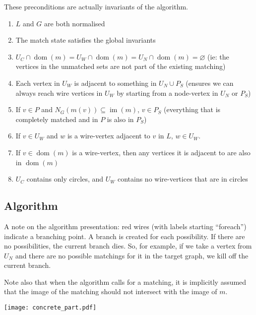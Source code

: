 \documentclass{article}
\DeclareMathOperator{\dom}{dom}
\DeclareMathOperator{\im}{im}
\begin{document}
These preconditions are actually invariants of the algorithm.

\begin{enumerate}
  \renewcommand{\theenumi}{(\roman{enumi})}
  \renewcommand{\labelenumi}{\theenumi}
  \item \label{enum:il-inv-norm} $L$ and $G$ are both normalised
  \item \label{enum:il-inv-inv} The match state satisfies the global invariants
  \item \label{enum:il-inv-unmatched} $U_C\cap\dom(m) = U_W\cap\dom(m) = U_N\cap\dom(m) = \varnothing$ (ie: the vertices in the unmatched sets are not part of the existing matching)
  \item \label{enum:il-inv-reachable} Each vertex in $U_W$ is adjacent to something in $U_N\cup P_S$ (ensures we can always reach wire vertices in $U_W$ by starting from a node-vertex in $U_N$ or $P_S$)
  \item \label{enum:il-inv-Ps} If $v \in P$ and $N_G(m(v)) \subseteq \im(m)$, $v \in P_S$ (everything that is completely matched and in $P$ is also in $P_S$)
  \item \label{enum:il-inv-wire-uw} If $v \in U_W$ and $w$ is a wire-vertex adjacent to $v$ in $L$, $w \in U_W$.
  \item \label{enum:il-inv-wire-connected} If $v \in \dom(m)$ is a wire-vertex, then any vertices it is adjacent to are also in $\dom(m)$
  \item \label{enum:il-inv-circles} $U_C$ contains only circles, and $U_W$ contains no wire-vertices that are in circles
\end{enumerate}

\subsection{Algorithm}

A note on the algorithm presentation: red wires (with labels starting ``foreach'') indicate a branching point.  A branch is created for each possibility.  If there are no possibilities, the current branch dies.  So, for example, if we take a vertex from $U_N$ and there are no possible matchings for it in the target graph, we kill off the current branch.

Note also that when the algorithm calls for a matching, it is implicitly assumed that the image of the matching should not intersect with the image of $m$.

\begin{center}
  \texttt{[image: concrete\_part.pdf]}
\end{center}
\end{document}
